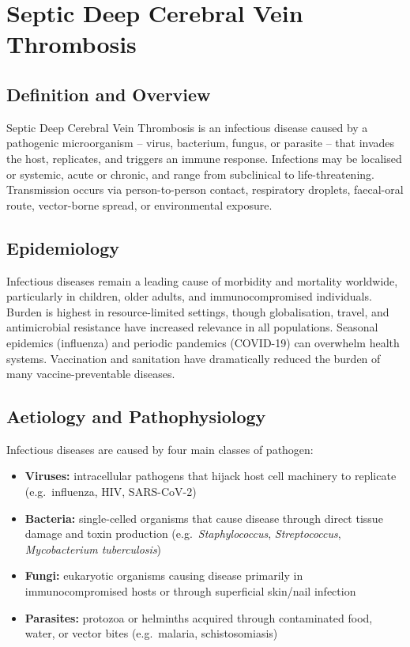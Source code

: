 \chapter{Septic Deep Cerebral Vein Thrombosis}

\section*{Definition and Overview}
Septic Deep Cerebral Vein Thrombosis is an infectious disease caused by a pathogenic microorganism -- virus, bacterium, fungus, or parasite -- that invades the host, replicates, and triggers an immune response. Infections may be localised or systemic, acute or chronic, and range from subclinical to life-threatening. Transmission occurs via person-to-person contact, respiratory droplets, faecal-oral route, vector-borne spread, or environmental exposure.

\section*{Epidemiology}
Infectious diseases remain a leading cause of morbidity and mortality worldwide, particularly in children, older adults, and immunocompromised individuals. Burden is highest in resource-limited settings, though globalisation, travel, and antimicrobial resistance have increased relevance in all populations. Seasonal epidemics (influenza) and periodic pandemics (COVID-19) can overwhelm health systems. Vaccination and sanitation have dramatically reduced the burden of many vaccine-preventable diseases.

\section*{Aetiology and Pathophysiology}
Infectious diseases are caused by four main classes of pathogen:

\begin{itemize}
    \item \textbf{Viruses:} intracellular pathogens that hijack host cell machinery to replicate (e.g.\ influenza, HIV, SARS-CoV-2)
    \item \textbf{Bacteria:} single-celled organisms that cause disease through direct tissue damage and toxin production (e.g.\ \textit{Staphylococcus}, \textit{Streptococcus}, \textit{Mycobacterium tuberculosis})
    \item \textbf{Fungi:} eukaryotic organisms causing disease primarily in immunocompromised hosts or through superficial skin/nail infection
    \item \textbf{Parasites:} protozoa or helminths acquired through contaminated food, water, or vector bites (e.g.\ malaria, schistosomiasis)
\end{itemize}

